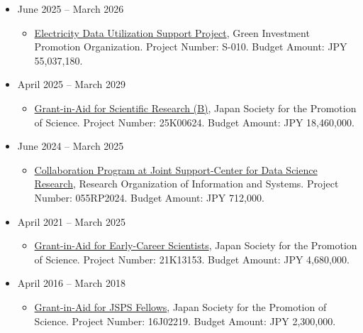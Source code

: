 \documentclass[
]{book}
\providecommand{\tightlist}{%
  \setlength{\itemsep}{0pt}\setlength{\parskip}{0pt}}
\begin{document}
\begin{itemize}
\tightlist
\item
  June 2025 -- March 2026

  \begin{itemize}
  \tightlist
  \item
    \href{https://www.teitanso.or.jp/smamedata/download/}{Electricity Data Utilization Support Project},
    Green Investment Promotion Organization.
    Project Number: S-010. Budget Amount: JPY 55,037,180.
  \end{itemize}
\item
  April 2025 -- March 2029

  \begin{itemize}
  \tightlist
  \item
    \href{https://kaken.nii.ac.jp/en/grant/KAKENHI-PROJECT-25K00624/}{Grant-in-Aid for Scientific Research (B)},
    Japan Society for the Promotion of Science.
    Project Number: 25K00624. Budget Amount: JPY 18,460,000.
  \end{itemize}
\item
  June 2024 -- March 2025

  \begin{itemize}
  \tightlist
  \item
    \href{(https://ds.rois.ac.jp/article/2024_rois-ds-joint_result)}{Collaboration Program at Joint Support-Center for Data Science Research},
    Research Organization of Information and Systems.
    Project Number: 055RP2024. Budget Amount: JPY 712,000.
  \end{itemize}
\item
  April 2021 -- March 2025

  \begin{itemize}
  \tightlist
  \item
    \href{https://kaken.nii.ac.jp/en/grant/KAKENHI-PROJECT-21K13153/}{Grant-in-Aid for Early-Career Scientists},
    Japan Society for the Promotion of Science.
    Project Number: 21K13153. Budget Amount: JPY 4,680,000.
  \end{itemize}
\item
  April 2016 -- March 2018

  \begin{itemize}
  \tightlist
  \item
    \href{https://kaken.nii.ac.jp/en/grant/KAKENHI-PROJECT-16J02219/}{Grant-in-Aid for JSPS Fellows},
    Japan Society for the Promotion of Science.
    Project Number: 16J02219. Budget Amount: JPY 2,300,000.
  \end{itemize}
\end{itemize}
\end{document}
